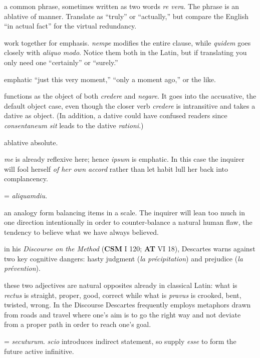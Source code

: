 a common phrase, sometimes written as two words \textit{re vera}. The phrase is an ablative of manner. Translate as ``truly'' or ``actually,'' but compare the English ``in actual fact'' for the virtual redundancy.

 work together for emphasis. \textit{nempe} modifies the entire clause, while \textit{quidem} goes closely with \textit{aliquo modo}. Notice them both in the Latin, but if translating you only need one ``certainly'' or ``surely.''

 emphatic ``just this very moment,'' ``only a moment ago,'' or the like.

 functions as the object of both \textit{credere} and \textit{negare}. It goes into the accusative, the default object case, even though the closer verb \textit{credere} is intransitive and takes a dative as object. (In addition, a dative could have confused readers since \textit{consentaneum sit} leads to the dative \textit{rationi}.)

 ablative absolute.

 \textit{me} is already reflexive here; hence \textit{ipsum} is emphatic. In this case the inquirer will fool herself \textit{of her own accord} rather than let habit lull her back into complancency.

 = \textit{aliquamdiu}. 

 an analogy form balancing items in a scale. The inquirer will lean too much in one direction intentionally in order to counter-balance a natural human flaw, the tendency to believe what we have always believed.

 in his \textit{Discourse on the Method} (\textbf{CSM} I 120; \textbf{AT} VI 18), Descartes warns against two key cognitive dangers: hasty judgment (\textit{la précipitation}) and prejudice (\textit{la prévention}).

 these two adjectives are natural opposites already in classical Latin: what is \textit{rectus} is straight, proper, good, correct while what is \textit{pravus} is crooked, bent, twisted, wrong.  In the {Discourse} Descartes frequently employs metaphors drawn from roads and travel where one's aim is to go the right way and not deviate from a proper path in order to reach one's goal.

 = \textit{secuturum}. \textit{scio} introduces indirect statement, so supply \textit{esse} to form the future active infinitive.

